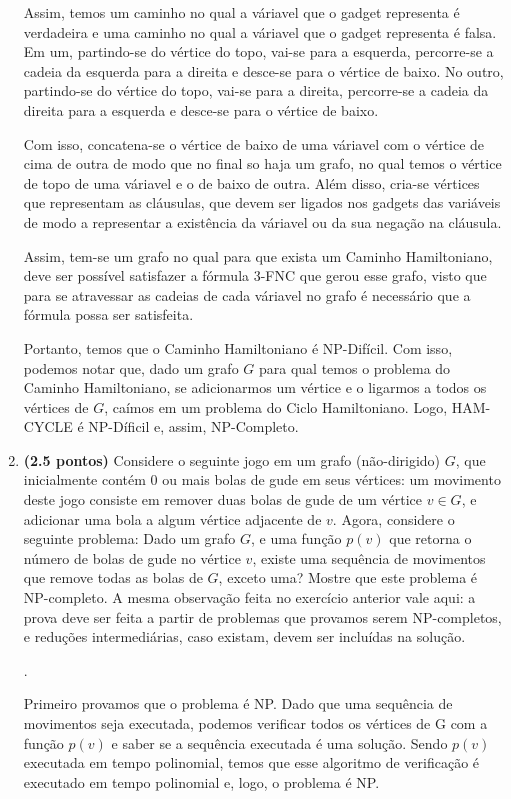 \documentclass[12pt]{article}
\newcommand{\resposta}[1]{ \noindent {\bf Solução}.{\color{blue} #1}}
\begin{document}
\begin{enumerate}
{    Assim, temos um caminho no qual a váriavel que o gadget representa
    é verdadeira e uma caminho no qual a váriavel que o gadget representa
    é falsa. Em um, partindo-se do vértice do topo, vai-se para a esquerda,
    percorre-se a cadeia da esquerda para a direita e desce-se para o
    vértice de baixo. No outro, partindo-se do vértice do topo, vai-se para a
    direita, percorre-se a cadeia da direita para a esquerda e desce-se para
    o vértice de baixo.

    Com isso, concatena-se o vértice de baixo de uma váriavel com o vértice de
    cima de outra de modo que no final so haja um grafo,
    no qual temos o vértice de topo
    de uma váriavel e o de baixo de outra. Além disso, cria-se vértices
    que representam as cláusulas, que devem ser ligados nos gadgets das
    variáveis de modo a representar a existência da váriavel ou da
    sua negação na cláusula.

    Assim, tem-se um grafo no qual para que exista um Caminho Hamiltoniano,
    deve ser possível satisfazer a fórmula 3-FNC que gerou esse grafo, visto
    que para se atravessar as cadeias de cada váriavel no grafo é necessário
    que a fórmula possa ser satisfeita.

    Portanto, temos que o Caminho Hamiltoniano é NP-Difícil. Com isso,
    podemos notar que, dado um grafo $G$ para qual temos o problema do
    Caminho Hamiltoniano, se adicionarmos um vértice e o ligarmos a todos
    os vértices de $G$, caímos em um problema do Ciclo Hamiltoniano. Logo,
    HAM-CYCLE é NP-Díficil e, assim, NP-Completo.
  }
  
\item {\bf (2.5 pontos)} Considere o seguinte jogo em um grafo
  (não-dirigido) $G$, que inicialmente contém 0 ou mais bolas de gude
  em seus vértices: um movimento deste jogo consiste em remover duas
  bolas de gude de um vértice $v\in G$, e adicionar uma bola a algum
  vértice adjacente de $v$. Agora, considere o seguinte problema: Dado
  um grafo $G$, e uma função $p(v)$ que retorna o número de bolas de
  gude no vértice $v$, existe uma sequência de movimentos que remove
  todas as bolas de $G$, exceto uma? Mostre que este problema é
  NP-completo. A mesma observação feita no exercício anterior vale
  aqui: a prova deve ser feita a partir de problemas que provamos
  serem NP-completos, e reduções intermediárias, caso existam, devem
  ser incluídas na solução.

  \resposta{
    Primeiro provamos que o problema é NP. Dado que uma sequência de
    movimentos seja executada, podemos verificar todos os vértices de G
    com a função $p(v)$ e saber se a sequência executada é uma solução.
    Sendo $p(v)$ executada em tempo polinomial, temos que esse
    algoritmo de verificação é executado em tempo polinomial e, logo,
    o problema é NP.

}
\end{enumerate}
\end{document}
